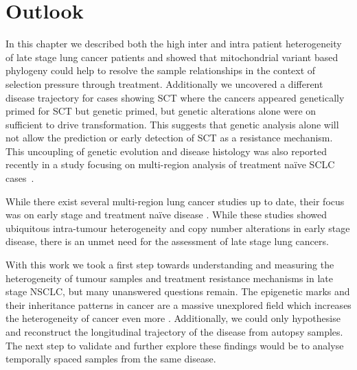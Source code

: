 \section{Outlook}
\label{cascade-sec:outlook}

In this chapter we described both the high inter and intra patient heterogeneity of late stage lung cancer patients and showed that mitochondrial variant based phylogeny could help to resolve the sample relationships in the context of selection pressure through treatment. Additionally we uncovered a different disease trajectory for cases showing SCT where the cancers appeared genetically primed for SCT but genetic primed, but genetic alterations alone were on sufficient to drive transformation. This suggests that genetic analysis alone will not allow the prediction or early detection of SCT as a resistance mechanism. This uncoupling of genetic evolution and disease histology was also reported recently in a study focusing on multi-region analysis of treatment na\"ive SCLC cases~\cite{Zhou2021}.

While there exist several multi-region lung cancer studies up to date, their focus was on early stage and treatment na\"ive disease \cite{JamalHanjani2017,Leong2018}. While these studies showed ubiquitous intra-tumour heterogeneity and copy number alterations in early stage disease, there is an unmet need for the assessment of late stage lung cancers.

With this work we took a first step towards understanding and measuring the heterogeneity of tumour samples and treatment resistance mechanisms in late stage NSCLC, but many unanswered questions remain. The epigenetic marks and their inheritance patterns in cancer are a massive unexplored field which increases the heterogeneity of cancer even more \cite{Easwaran2014}. Additionally, we could only hypothesise and reconstruct the longitudinal trajectory of the disease from autopsy samples. The next step to validate and further explore these findings would be to analyse temporally spaced samples from the same disease.